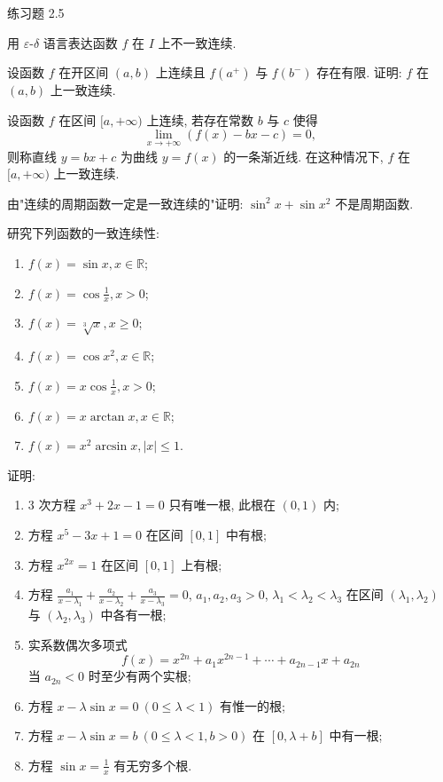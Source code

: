 \begin{exblock}{练习题 2.5}
\item 用 $\varepsilon$-$\delta$ 语言表达函数 $f$ 在 $I$ 上不一致连续.

\item 设函数 $f$ 在开区间 $(a,b)$ 上连续且 $f(a^+)$ 与 $f(b^-)$ 存在有限. 证明: $f$ 在 $(a,b)$ 上一致连续.

\item 设函数 $f$ 在区间 $[a,+\infty)$ 上连续, 若存在常数 $b$ 与 $c$ 使得
  \[
  \lim_{x \to +\infty} (f(x) - bx - c) = 0,
\]
  则称直线 $y = bx + c$ 为曲线 $y = f(x)$ 的一条渐近线. 在这种情况下, $f$ 在 $[a,+\infty)$ 上一致连续.

\item 由"连续的周期函数一定是一致连续的"证明: $\sin^2 x + \sin x^2$ 不是周期函数.

\item 研究下列函数的一致连续性:
  \begin{enumerate}[label=(\arabic*)]
    \item $f(x) = \sin x, x \in \mathbb{R}$;
    \item $f(x) = \cos\frac{1}{x}, x > 0$;
    \item $f(x) = \sqrt[3]{x}, x \geqslant 0$;
    \item $f(x) = \cos x^2, x \in \mathbb{R}$;
    \item $f(x) = x\cos\frac{1}{x}, x > 0$;
    \item $f(x) = x\arctan x, x \in \mathbb{R}$;
    \item $f(x) = x^2\arcsin x, |x| \leqslant 1$.
  \end{enumerate}

\item 证明:
  \begin{enumerate}[label=(\arabic*)]
    \item 3 次方程 $x^3 + 2x - 1 = 0$ 只有唯一根, 此根在 $(0,1)$ 内;
    \item 方程 $x^5 - 3x + 1 = 0$ 在区间 $[0,1]$ 中有根;
    \item 方程 $x^{2x} = 1$ 在区间 $[0,1]$ 上有根;
    \item 方程 $\frac{a_1}{x - \lambda_1} + \frac{a_2}{x - \lambda_2} + \frac{a_3}{x - \lambda_3} = 0$, $a_1, a_2, a_3 > 0$, $\lambda_1 < \lambda_2 < \lambda_3$ 在区间 $(\lambda_1, \lambda_2)$ 与 $(\lambda_2, \lambda_3)$ 中各有一根;
    \item 实系数偶次多项式
      \[
      f(x) = x^{2n} + a_1 x^{2n-1} + \cdots + a_{2n-1}x + a_{2n}
\]
      当 $a_{2n} < 0$ 时至少有两个实根;
    \item 方程 $x - \lambda\sin x = 0\ (0 \leqslant \lambda < 1)$ 有惟一的根;
    \item 方程 $x - \lambda\sin x = b\ (0 \leqslant \lambda < 1, b > 0)$ 在 $[0, \lambda + b]$ 中有一根;
    \item 方程 $\sin x = \frac{1}{x}$ 有无穷多个根.
  \end{enumerate}


\end{exblock}
